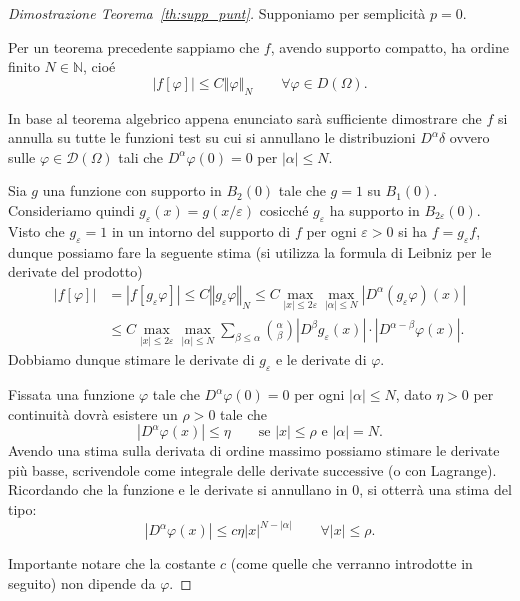 \documentclass[italian,a4paper,oneside,headinclude]{scrbook}
\newcommand{\eps}{\varepsilon}
\renewcommand{\phi}{\varphi}
\newcommand{\D}{\mathcal D}
\newcommand{\NN}{\mathbb N}
\newcommand{\abs}[1]{{\left|#1\right|}}
\newcommand{\Abs}[1]{{\left\Vert #1\right\Vert}}
\begin{document}
\begin{proof}[Dimostrazione Teorema~\ref{th:supp_punt}]
  Supponiamo per semplicità $p=0$.

  Per un teorema precedente sappiamo che $f$, avendo supporto
  compatto, ha ordine finito $N\in \NN$, cioé
  \[
  \abs{f[\phi]} \le C \Abs{\phi}_N \qquad \forall \phi \in D(\Omega).
  \]

  In base al teorema algebrico appena enunciato sarà sufficiente dimostrare
  che $f$ si annulla su tutte le funzioni test su cui si annullano le
  distribuzioni $D^\alpha \delta$ ovvero sulle $\phi\in \D(\Omega)$
  tali che $D^\alpha \phi(0)=0$ per $\abs{\alpha}\le N$.

  Sia $g$ una funzione con supporto in $B_2(0)$ tale che $g=1$ su
  $B_1(0)$.
  Consideriamo quindi $g_\eps(x) = g(x/\eps)$ cosicché $g_\eps$ ha
  supporto in $B_{2\eps}(0)$. Visto che $g_\eps =1$ in un intorno del
  supporto di $f$ per ogni $\eps>0$ si ha
  $f=g_\eps f$, dunque possiamo fare la seguente stima (si utilizza la
  formula di Leibniz per le derivate del prodotto)
  \begin{equation}\label{eq:stima_supp_punt}
    \begin{aligned}
      \abs{f[\phi]} & = \abs{f[g_\eps\phi]} \le C \Abs{g_\eps \phi}_N
      \le C \max_{\abs{x}\le 2\eps} \max_{\abs{\alpha}\le N}
      \abs{D^\alpha(g_\eps \phi)(x)} \\
      &\le C \max_{\abs{x}\le 2\eps}\max_{\abs{\alpha}\le N}\sum_{\beta\le \alpha} {\alpha \choose \beta} \abs{D^\beta
        g_\eps(x)}\cdot\abs{D^{\alpha-\beta} \phi(x)}.
    \end{aligned}
  \end{equation}
  Dobbiamo dunque stimare le derivate di $g_\eps$ e le derivate di
  $\phi$.

  Fissata una funzione $\phi$ tale che $D^\alpha\phi(0)=0$ per ogni
  $\abs{\alpha} \le N$, dato $\eta>0$
  per continuità dovrà esistere un $\rho>0$
  tale che
  \[
  \abs{D^\alpha\phi(x)}\le \eta\qquad\text{se $\abs{x}\le \rho$ e
    $\abs{\alpha} = N$}.
  \]
  Avendo una stima sulla derivata di ordine massimo possiamo
  stimare le derivate più basse, scrivendole come integrale delle
  derivate successive (o con Lagrange).
  Ricordando che la funzione e le derivate si
  annullano in $0$, si otterrà una stima del tipo:
  \[
  \abs{D^\alpha \phi(x)} \le c \eta \abs{x}^{N-\abs{\alpha}}
  \qquad \forall \abs{x}\le \rho.
  \]

  Importante notare che la costante $c$ (come quelle che verranno
  introdotte in seguito) non dipende da $\phi$.


\end{proof}
\end{document}
